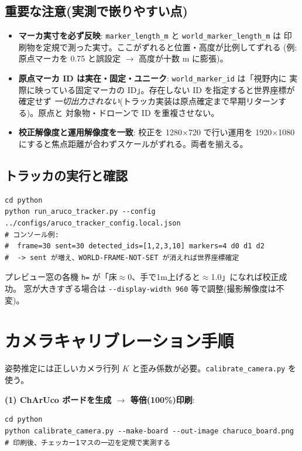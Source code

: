 \documentclass[11pt,a4paper]{ltjsarticle}
\newcommand{\code}[1]{\texttt{\small #1}}
\begin{document}
\subsection{重要な注意(実測で嵌りやすい点)}
\begin{itemize}[leftmargin=1.4em]
  \item \textbf{マーカ実寸を必ず反映}: \code{marker\_length\_m} と \code{world\_marker\_length\_m} は
        印刷物を定規で測った実寸。ここがずれると位置・高度が比例してずれる
        (例: 原点マーカを 0.75 と誤設定 $\to$ 高度が十数 m に膨張)。
  \item \textbf{原点マーカ ID は実在・固定・ユニーク}: \code{world\_marker\_id} は「視野内に
        実際に映っている固定マーカの ID」。存在しない ID を指定すると世界座標が確定せず
        \emph{一切出力されない}(トラッカ実装は原点確定まで早期リターンする)。原点と
        対象物・ドローンで ID を重複させない。
  \item \textbf{校正解像度と運用解像度を一致}: 校正を 1280$\times$720 で行い運用を
        1920$\times$1080 にすると焦点距離が合わずスケールがずれる。両者を揃える。
\end{itemize}

\subsection{トラッカの実行と確認}
\begin{lstlisting}
cd python
python run_aruco_tracker.py --config ../configs/aruco_tracker_config.local.json
# コンソール例:
#  frame=30 sent=30 detected_ids=[1,2,3,10] markers=4 d0 d1 d2
#  -> sent が増え、WORLD-FRAME-NOT-SET が消えれば世界座標確定
\end{lstlisting}
プレビュー窓の各機 \code{h=} が「床$\approx$0、手で1m上げると$\approx$1.0」になれば校正成功。
窓が大きすぎる場合は \code{-{}-display-width 960} 等で調整(撮影解像度は不変)。

\section{カメラキャリブレーション手順}
姿勢推定には正しいカメラ行列 $K$ と歪み係数が必要。\code{calibrate\_camera.py} を使う。

\textbf{(1) ChArUco ボードを生成 $\to$ 等倍(100\%)印刷}:
\begin{lstlisting}
cd python
python calibrate_camera.py --make-board --out-image charuco_board.png
# 印刷後、チェッカー1マスの一辺を定規で実測する
\end{lstlisting}
\end{document}
